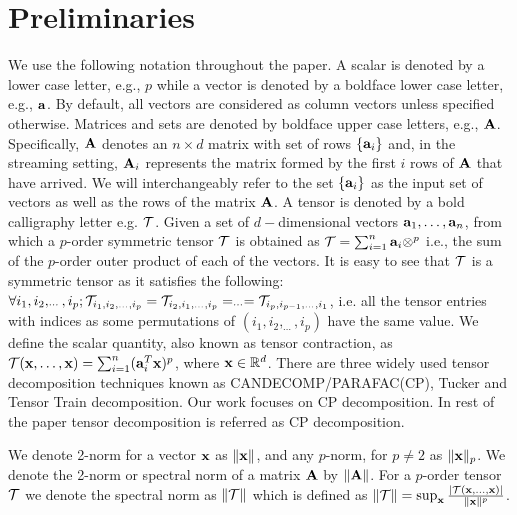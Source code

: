 \section{Preliminaries}{\label{sec:prelimnary}}
We use the following notation throughout the paper. A scalar is denoted by a lower case letter, e.g., $p$ while a vector is denoted by a boldface lower case letter, e.g., $\mathbf{a}$. 
By default, all vectors are considered as column vectors unless specified otherwise. Matrices and sets are denoted by boldface upper case letters, e.g., $\mathbf{A}$. %
Specifically, $\mathbf{A}$ denotes an $n\times d$ matrix
with set of rows $\{\mathbf{a}_{i}\}$ and, in the streaming setting, $\mathbf{A}_{i}$ represents the matrix formed by the first $i$ rows of $\mathbf{A}$ that have arrived. We will interchangeably refer to the set $\{\mathbf{a}_i\}$ as the input set of vectors as well as the rows of the matrix $\mathbf{A}$. A tensor is denoted by a bold calligraphy letter e.g. $\mathbf{\mathcal{T}}$. Given a set of $d-$dimensional vectors $\mathbf{a}_1, \ldots, \mathbf{a}_n$, from which a $p$-order symmetric tensor $\mathbf{\mathcal{T}}$ is obtained as
$ \mathbf{\mathcal{T}} = \sum_{i=1}^n \mathbf{a}_i \otimes^{p}$
i.e., the sum of the $p$-order outer product of each of the vectors. It is easy to see that $\mathbf{\mathcal{T}}$ is a symmetric tensor as it satisfies
the following: $\forall i_{1},i_{2},_{\cdots},i_{p}; \mathbf{\mathcal{T}}_{i_{1},i_{2},_{\cdots},i_{p}} = \mathbf{\mathcal{T}}_{i_{2},i_{1},_{\cdots},i_{p}} = _{\cdots} = \mathbf{\mathcal{T}}_{i_{p},i_{p-1},_{\cdots},i_{1}}$, i.e. all the tensor entries with indices as some permutations of $(i_1, i_2, _{\cdots}, i_p)$ have the same value. We define the scalar quantity, also known as tensor contraction, as $\mathbf{\mathcal{T}}(\mathbf{x},\ldots,\mathbf{x}) = \sum_{i=1}^{n}(\mathbf{a}_i^T\mathbf{x})^p$, where $\mathbf{x} \in \mathbb{R}^{d}$. There are three widely used tensor decomposition techniques known as CANDECOMP/PARAFAC(CP), Tucker and Tensor Train decomposition. Our work focuses on CP decomposition. In rest of the paper tensor decomposition is referred as CP decomposition.

We denote 2-norm for a vector $\mathbf{x}$ as $\|\mathbf{x}\|$, and any $p$-norm, for $p\neq 2$ as $\|\mathbf{x}\|_p$. We denote the 2-norm or spectral norm of a matrix $\mathbf{A}$ by $\|\mathbf{A}\|$. For a $p$-order tensor $\mathbf{\mathcal{T}}$ we denote the spectral norm as $\|\mathbf{\mathcal{T}}\|$ which is defined as $\|\mathbf{\mathcal{T}}\| = \sup_{\mathbf{x}}\frac{|\mathbf{\mathcal{T}}(\mathbf{x},\ldots,\mathbf{x})|}{\|\mathbf{x}\|^{p}}$.

